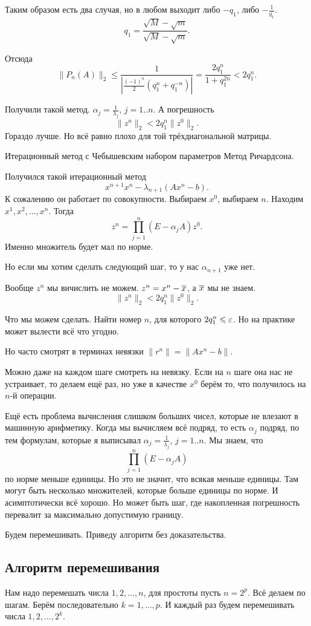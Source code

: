 Таким образом есть два случая, но в любом выходит либо $-q_1$, либо $-\frac1{q_1}$.
\[
  q_1 = \frac{\sqrt M - \sqrt m}{\sqrt M - \sqrt m}.
\]

Отсюда 
\[
  \big\|P_n(A)\big\|_2\le \frac{1}{\left|\frac{(-1)^n}2(q_1^n + q_1^{-n})\right|} = \frac{2q_1^n}{1 + q_1^{2n}}<2q_1^n.
\]

Получили такой метод. $\alpha_j = \frac1{\lambda_j}$, $j=1..n$. А погрешность
\[
  \|z^n\|_2 < 2 q_1^n \|z^0\|_2.
\]
Гораздо лучше. Но всё равно плохо для той трёхдиагональной матрицы.

Итерационный метод с Чебышевским набором параметров
Метод Ричардсона.

Получился такой итерационный метод
\[
  x^{n+1} x^n - \lambda_{n+1}(Ax^n - b).
\]
К сожалению он работает по совокупности. Выбираем $x^0$, выбираем $n$. Находим $x^1,x^2,\dots,x^n$. Тогда
\[
  z^n = \prod\limits_{j=1}^n (E - \alpha_j A) z^0.
\]
Именно множитель будет мал по норме.

Но если мы хотим сделать следующий шаг, то у нас $\alpha_{n+1}$ уже нет.

Вообще $z^n$ мы вичислить не можем. $z^n = x^n - \overline{x}$, а $\overline{x}$ мы не знаем.
\[
  \|z^n\|_2 < 2 q_1^n\|z^0\|_2.
\]

Что мы можем сделать. Найти номер $n$, для которого $2 q_1^n\leqslant \varepsilon$. Но на практике может вылести всё что угодно.

Но часто смотрят в терминах невязки $\|r^n\| = \|Ax^n - b\|$.

Можно даже на каждом шаге смотреть на невязку. Если на $n$ шаге она нас не устраивает, то делаем ещё раз, но уже в качестве $x^0$ берём то, что получилось на $n$-й операции.


Ещё есть проблема вычисления слишком больших чисел, которые не влезают в машинную арифметику. Когда мы вычисляем всё подряд, то есть $\alpha_j$ подряд, по тем формулам, которые я выписывал $\alpha_j = \frac1{\lambda_j}$, $j=1..n$. Мы знаем, что
\[
  \prod\limits_{j=1}^n(E-\alpha_jA)
\]
по норме меньше единицы. Но это не значит, что всякая меньше единицы. Там могут быть несколько множителей, которые больше единицы по норме. И асимптотически всё хорошо. Но может быть шаг, где накопленная погрешность перевалит за максимально допустимую границу.

Будем перемешивать. Приведу алгоритм без доказательства.
\subsection{Алгоритм перемешивания}
Нам надо перемешать числа $1,2,\dots, n$, для простоты пусть $n = 2^p$. Всё делаем по шагам. Берём последовательно $k=1,\dots, p$. И каждый раз будем перемешивать числа $1,2,\dots,2^k$.

